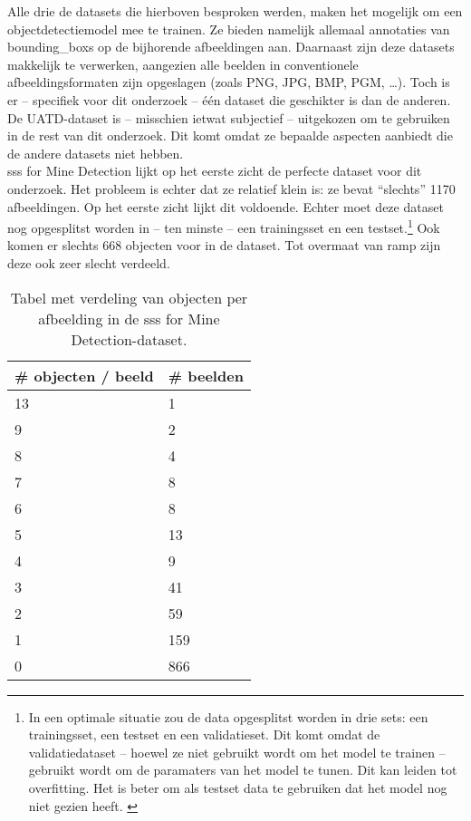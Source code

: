 Alle drie de datasets die hierboven besproken werden, maken het mogelijk om een objectdetectiemodel mee te trainen. Ze bieden namelijk allemaal annotaties van \glspl{bounding_box} op de bijhorende afbeeldingen aan. Daarnaast zijn deze datasets makkelijk te verwerken, aangezien alle beelden in conventionele afbeeldingsformaten zijn opgeslagen (zoals PNG, JPG, BMP, PGM, \dots). Toch is er -- specifiek voor dit onderzoek -- één dataset die geschikter is dan de anderen. De UATD-dataset is -- misschien ietwat subjectief -- uitgekozen om te gebruiken in de rest van dit onderzoek. Dit komt omdat ze bepaalde aspecten aanbiedt die de andere datasets niet hebben. \\

\gls{sss} for Mine Detection lijkt op het eerste zicht de perfecte dataset voor dit onderzoek. Het probleem is echter dat ze relatief klein is: ze bevat ``slechts'' 1170 afbeeldingen. Op het eerste zicht lijkt dit voldoende. Echter moet deze dataset nog opgesplitst worden in -- ten minste -- een trainingsset en een testset.\footnote{In een optimale situatie zou de data opgesplitst worden in drie sets: een trainingsset, een testset en een validatieset. Dit komt omdat de validatiedataset -- hoewel ze niet gebruikt wordt om het model te trainen -- gebruikt wordt om de paramaters van het model te tunen. Dit kan leiden tot \gls{overfitting}. Het is beter om als testset data te gebruiken dat het model nog niet gezien heeft. \autocite{Goodfellow_2016}} Ook komen er slechts 668 objecten voor in de dataset. Tot overmaat van ramp zijn deze ook zeer slecht verdeeld. 

\begin{table}[H]
    \centering
    \begin{tabular}{ll}
        \toprule
        \textbf{\# objecten / beeld} & \textbf{\# beelden} \\
        \midrule
        13 & 1 \\
        9  & 2 \\
        8  & 4 \\
        7  & 8 \\
        6  & 8 \\
        5  & 13 \\
        4  & 9 \\
        3  & 41 \\
        2  & 59 \\
        1  & 159 \\
        0  & 866 \\
        \bottomrule
    \end{tabular}
    \caption[Aantal objecten per afbeelding in SSS for Mine Data]{\label{tab:objects_per_image_sss} Tabel met verdeling van objecten per afbeelding in de \gls{sss} for Mine Detection-dataset.}
\end{table}


